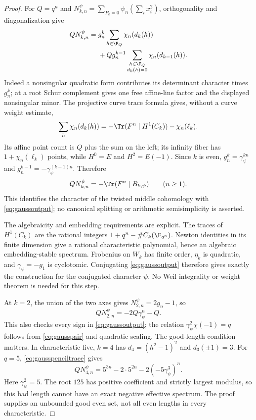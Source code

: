 \begin{proof}
For $Q=q^n$ and
$N_{k,n}^\psi=\sum_{P_k=0}\psi_n(\sum_i x_i^2)$,
orthogonality and diagonalization give
\begin{align}
 QN_{k,n}^\psi
 ={}&g_n^k\sum_{h\in\F_Q}\chi_n(d_k(h))\notag\\
 &+Qg_n^{k-1}
       \sum_{\substack{h\in\F_Q\\d_k(h)=0}}
                         \chi_n(d_{k-1}(h)).
 \label{eq:gausspenciltrace}
\end{align}
Indeed a nonsingular quadratic form contributes its
determinant character times $g_n^k$; at a root Schur
complement gives one free affine-line factor and the
displayed nonsingular minor. The projective curve trace
formula gives, without a curve weight estimate,
\[
 \sum_h\chi_n(d_k(h))
 =-\Tr(F^n\mid H^1(C_k))-\chi_n(\ell_k).
\]
Its affine point count is $Q$ plus the sum on the left;
its infinity fiber has $1+\chi_n(\ell_k)$ points, while
$H^0=E$ and $H^2=E(-1)$.
Since $k$ is even, $g_n^k=\gamma_\psi^{kn}$ and
$g_n^{k-1}=-\gamma_\psi^{(k-1)n}$. Therefore
\begin{equation}\label{eq:gaussnegativesign}
 QN_{k,n}^\psi=-\Tr(F^n\mid B_{k,\psi})
                      \qquad(n\ge1).
\end{equation}
This identifies the character of the twisted middle
cohomology with \eqref{eq:gaussoutput}; no canonical
splitting or arithmetic semisimplicity is asserted.

The algebraicity and embedding requirements are explicit.
The traces of $H^1(C_k)$ are the rational integers
$1+q^n-\#C_k(\F_{q^n})$. Newton identities in its finite
dimension give a rational characteristic polynomial, hence
an algebraic embedding-stable spectrum. Frobenius on $W_k$
has finite order, $\eta_k$ is quadratic, and
$\gamma_\psi=-g_1$ is cyclotomic. Conjugating
\eqref{eq:gaussoutput} therefore gives exactly the
construction for the conjugated character $\psi$.
No Weil integrality or weight theorem is needed for this step.

At $k=2$, the union of the two axes gives
$N_{2,n}^\psi=2g_n-1$, so
\[
 QN_{2,n}^\psi=-2Q\gamma_\psi^n-Q.
\]
This also checks every sign in \eqref{eq:gaussoutput};
the relation $\gamma_\psi^2\chi(-1)=q$ follows from
\eqref{eq:gausspair} and quadratic scaling.
The good-length condition matters. In characteristic five,
$k=4$ has $d_4=(h^2-1)^2$ and $d_3(\pm1)=3$.
For $q=5$, \eqref{eq:gausspenciltrace} gives
\[
 QN_{4,n}^\psi=5^{3n}-2\cdot5^{2n}
                         -2(-5\gamma_\psi^3)^n.
\]
Here $\gamma_\psi^2=5$. The root $125$ has positive
coefficient and strictly largest modulus, so this bad
length cannot have an exact negative effective spectrum.
The proof supplies an unbounded good even set, not all
even lengths in every characteristic.


\end{proof}
